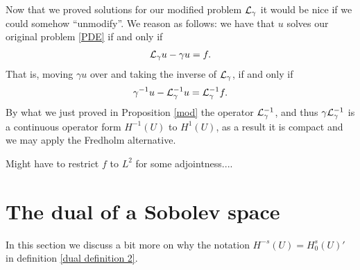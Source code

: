 \documentclass[12pt]{article}
\theoremstyle{definition}
\newcommand{\red}[1]{{\color{red}#1}}
\begin{document}
Now that we proved solutions for our modified problem $\mathcal{L}_\gamma $ it would be nice if we could somehow ``unmodify''. We reason as follows: we have that $u$ solves our original problem  \eqref{PDE} if and only if
\begin{align*}
	\mathcal{L}_\gamma u - \gamma  u =f.
\end{align*}
That is, moving $\gamma  u$ over and taking the inverse of $\mathcal{L}_\gamma $, if and only if
\begin{align*}
	\gamma^{-1}u -\mathcal{L}_\gamma ^{-1} u = \mathcal{L}_\gamma ^{-1}f.
\end{align*}
By what we just proved in Proposition \ref{mod} the operator $\mathcal{L}_\gamma^{-1}$, and thus $ \gamma \mathcal{L}_\gamma ^{-1}$ is a continuous operator form $H^{-1}(U)$ to  $H^{1}(U)$, as a result it is compact and we may apply the Fredholm alternative.

\red{Might have to restrict $f$ to  $L^2$ for some adjointness....}

\appendix
\section{The dual of a Sobolev space}\label{dual section}
In this section we discuss a bit more on why the notation $H^{-s}(U)=H_0^s(U)'$ in definition \ref{dual definition 2}.
\end{document}
